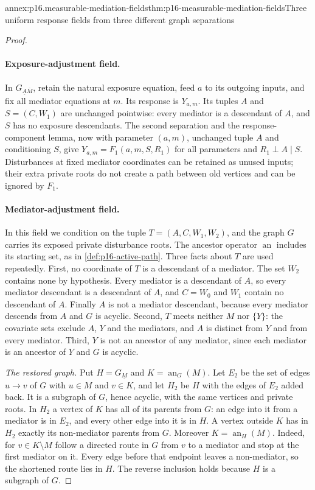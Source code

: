 \begin{annexitem}{annex:p16.measurable-mediation-fields}{thm:p16-measurable-mediation-fields}{Three uniform response fields from three different graph separations}
\begin{proof}
\paragraph{Exposure-adjustment field.}
In \(G_{\underline A\overline M}\), retain the natural exposure
equation, feed \(a\) to its outgoing inputs, and fix all mediator
equations at \(m\). Its response is \(Y_{a,m}\). Its tuples
\(A\) and \(S=(C,W_1)\) are unchanged pointwise: every mediator
is a descendant of \(A\), and \(S\) has no exposure descendants.
The second separation and the response-component lemma, now with
parameter \((a,m)\), unchanged tuple \(A\) and conditioning \(S\),
give \(Y_{a,m}=F_1(a,m,S,R_1)\) for all parameters and
\(R_1\perp A\mid S\). Disturbances at fixed mediator coordinates
can be retained as unused inputs; their extra private roots do not
create a path between old vertices and can be ignored by \(F_1\).

\paragraph{Mediator-adjustment field.}
In this field we condition on the tuple
\(T=(A,C,W_1,W_2)\), and the graph
\(G\) carries its exposed private disturbance roots. The ancestor
operator \(\operatorname{an}\) includes its starting set, as in
\cref{def:p16-active-path}. Three facts about \(T\) are used
repeatedly. First, no coordinate of \(T\) is a descendant of a
mediator. The set \(W_2\) contains none by hypothesis. Every mediator
is a descendant of \(A\), so every mediator descendant is a descendant
of \(A\), and \(C=W_0\) and \(W_1\) contain no descendant of \(A\).
Finally \(A\) is not a mediator descendant, because every mediator
descends from \(A\) and \(G\) is acyclic. Second, \(T\) meets neither
\(M\) nor \(\{Y\}\): the covariate sets exclude \(A\), \(Y\) and the
mediators, and \(A\) is distinct from \(Y\) and from every mediator.
Third, \(Y\) is not an ancestor of any mediator, since each mediator
is an ancestor of \(Y\) and \(G\) is acyclic.

\emph{The restored graph.} Put \(H=G_{\underline M}\) and
\(K=\operatorname{an}_G(M)\). Let \(E_2\) be the set of edges
\(u\to v\) of \(G\) with \(u\in M\) and \(v\in K\), and let \(H_2\)
be \(H\) with the edges of \(E_2\) added back. It is a subgraph of
\(G\), hence acyclic, with the same vertices and private roots. In
\(H_2\) a vertex of \(K\) has all of its parents from \(G\): an edge
into it from a mediator is in \(E_2\), and every other edge into it
is in \(H\). A vertex outside \(K\) has in \(H_2\) exactly its
non-mediator parents from \(G\). Moreover
\(K=\operatorname{an}_H(M)\). Indeed, for \(v\in K\setminus M\)
follow a directed route in \(G\) from \(v\) to a mediator and stop at
the first mediator on it. Every edge before that endpoint leaves a
non-mediator, so the shortened route lies in \(H\). The reverse
inclusion holds because \(H\) is a subgraph of \(G\).


\end{proof}
\end{annexitem}

